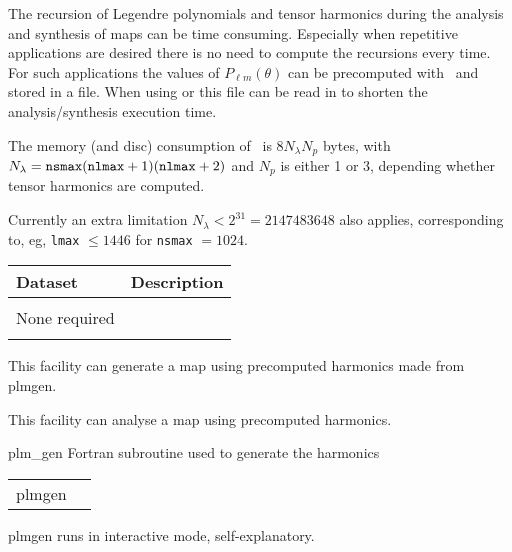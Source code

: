 \begin{codedescription}
{
The recursion of Legendre polynomials 
and tensor harmonics during the  analysis and synthesis 
of \healpix maps can be time consuming. 
Especially when repetitive applications are desired
there is no need to compute the recursions every time. 
For such applications the values of $P_{\ell m}(\theta)$  
can be precomputed with \thedocid\ 
and stored in a file. When using  or  
this file can be read in to 
shorten  the analysis/synthesis execution time. 

The memory (and disc) consumption of \thedocid\    is $8 N_\lambda N_p$ bytes, with
$N_\lambda = {\tt nsmax} ({\tt nlmax}+1)({\tt nlmax}+2)$ and
$N_p$ is either 1 or 3, depending whether tensor harmonics are computed. 

Currently an extra limitation $N_\lambda < 2^{31} = 2147483648$ also applies,
corresponding to, eg, {\tt lmax} $\le 1446$ for {\tt nsmax} $=1024$.}
\end{codedescription}

\begin{datasets}
{
\begin{tabular}{p{0.3\hsize} p{0.35\hsize}} \hline  
  \textbf{Dataset} & \textbf{Description} \\ \hline
                   &                      \\ %
 None required & \\
                   &                      \\ \hline %
\end{tabular}
} 
\end{datasets}

\begin{support}
  \begin{sulist}{} %
  \item[\htmlref{synfast}{fac:synfast}] This \healpix facility can generate a map using precomputed harmonics made from plmgen.
  \item[\htmlref{anafast}{fac:anafast}] This \healpix facility can analyse a map using precomputed harmonics.
  \item[plm\_gen] Fortran subroutine used to generate the harmonics
  \end{sulist}
\end{support}

\begin{examples}{1}
{
\begin{tabular}{ll} %
plmgen  \\
\end{tabular}
}
{
plmgen runs in interactive mode, self-explanatory.
}
\end{examples}


